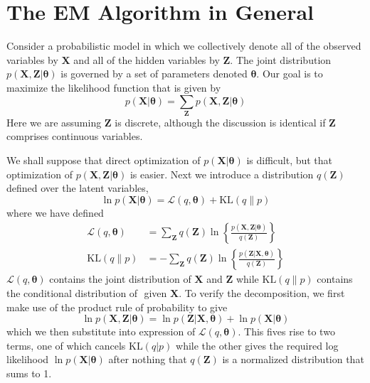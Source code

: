 \documentclass[5p,sort&compress]{elsarticle}
\begin{document}
\section{The EM Algorithm in General}

Consider a probabilistic model in which we collectively denote all of the observed variables by $\mathbf{X}$ and all of the hidden variables by $\mathbf{Z}$. The joint distribution $p(\mathbf{X}, \mathbf{Z}|\boldsymbol{\theta})$ is governed by a set of parameters denoted $\boldsymbol{\theta}$. Our goal is to maximize the likelihood function that is given by
\begin{equation}
p(\mathbf{X} | \boldsymbol{\theta})=\sum_{\mathbf{Z}} p(\mathbf{X}, \mathbf{Z} | \boldsymbol{\theta})
\end{equation}
Here we are assuming $\mathbf{Z}$ is discrete, although the discussion is identical if $\mathbf{Z}$ comprises continuous variables.

We shall suppose that direct optimization of $p(\mathbf{X}|\boldsymbol{\theta})$ is difficult, but that optimization of $p(\mathbf{X}, \mathbf{Z}|\boldsymbol{\theta})$ is easier. Next we introduce a distribution $q(\mathbf{Z})$ defined over the latent variables,
\begin{equation}\label{decomposition}
\ln p(\mathbf{X} | \boldsymbol{\theta})=\mathcal{L}(q, \boldsymbol{\theta})+\mathrm{KL}(q \| p)
\end{equation}
where we have defined
\begin{equation}
\begin{aligned} \mathcal{L}(q, \boldsymbol{\theta}) &=\sum_{\mathbf{Z}} q(\mathbf{Z}) \ln \left\{\frac{p(\mathbf{X}, \mathbf{Z} | \boldsymbol{\theta})}{q(\mathbf{Z})}\right\} \\ \mathrm{KL}(q \| p) &=-\sum_{\mathbf{Z}} q(\mathbf{Z}) \ln \left\{\frac{p(\mathbf{Z} | \mathbf{X}, \boldsymbol{\theta})}{q(\mathbf{Z})}\right\} \end{aligned}
\end{equation}
$\mathcal{L}(q, \boldsymbol{\theta})$ contains the joint distribution of $\mathbf{X}$ and $\mathbf{Z}$ while $\mathrm{KL}(q \| p)$ contains the conditional distribution of $\mathbf{}$ given $\mathbf{X}$. To verify the decomposition, we first make use of the product rule of probability to give
\begin{equation}
\ln p(\mathbf{X}, \mathbf{Z} | \boldsymbol{\theta})=\ln p(\mathbf{Z} | \mathbf{X}, \boldsymbol{\theta})+\ln p(\mathbf{X} | \boldsymbol{\theta})
\end{equation}
which we then substitute into expression of $\mathcal{L}(q, \boldsymbol{\theta})$. This fives rise to two terms, one of which cancels $\mathrm{KL}(q|p)$ while the other gives the required log likelihood $\ln{p(\mathbf{X}|\boldsymbol{\theta})}$ after nothing that $q(\mathbf{Z})$ is a normalized distribution that sums to 1.
\end{document}
